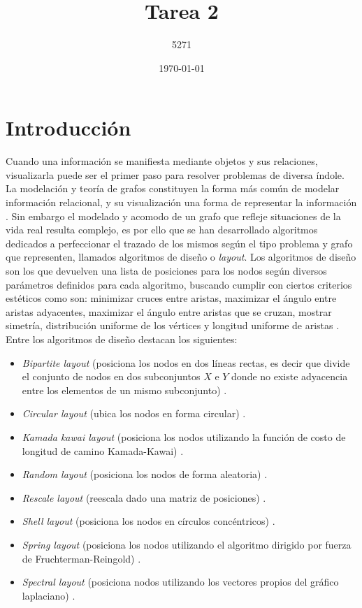 \documentclass{article}
\title{Tarea 2}
\author{5271}
\date{\today}
\begin{document}
\maketitle
\section{Introducción}
Cuando una información se manifiesta mediante objetos y sus relaciones, visualizarla puede ser el primer paso para resolver problemas de diversa índole. 
La modelación y teoría de grafos constituyen la forma más común de modelar información relacional, y su visualización una forma de representar la información \cite {tesis}.\linebreak
Sin embargo el modelado y acomodo de un grafo que refleje situaciones de la vida real resulta complejo, es por ello que se han desarrollado algoritmos dedicados a perfeccionar el trazado de los mismos según el tipo problema y grafo que representen, llamados algoritmos de diseño o \textit{layout}.\linebreak
Los algoritmos de diseño son los que devuelven una lista de posiciones para los nodos según diversos parámetros definidos para cada algoritmo, buscando cumplir con ciertos criterios estéticos como son: minimizar cruces entre aristas, maximizar el ángulo entre aristas adyacentes, maximizar el ángulo entre aristas que se cruzan, mostrar simetría, distribución uniforme de los vértices y longitud uniforme de aristas \cite {tesis}.\linebreak
Entre los algoritmos de diseño destacan los siguientes:

\begin{itemize}
 \item\textit{Bipartite layout} (posiciona los nodos en dos líneas rectas, es decir que divide el conjunto de nodos en dos subconjuntos $ X $ e $ Y $ donde no existe adyacencia entre los elementos de un mismo subconjunto)  \cite{networkx}.  
 \item\textit{Circular layout} (ubica los nodos en forma circular) \cite{networkx}.
	\item\textit{Kamada kawai layout} (posiciona los nodos utilizando la función de costo de longitud de camino Kamada-Kawai) \cite{networkx}.
	\item\textit{Random layout} (posiciona los nodos de forma aleatoria) \cite{networkx}.
	\item\textit{Rescale layout} (reescala dado una matriz de posiciones) \cite{networkx}.
	\item\textit{Shell layout} (posiciona los nodos en círculos concéntricos) \cite{networkx}.
	\item\textit{Spring layout} (posiciona los nodos utilizando el algoritmo dirigido por fuerza de Fruchterman-Reingold) \cite{networkx}.
	\item\textit{Spectral layout} (posiciona nodos utilizando los vectores propios del gráfico laplaciano) \cite{networkx}.
\end{itemize}
\end{document}

